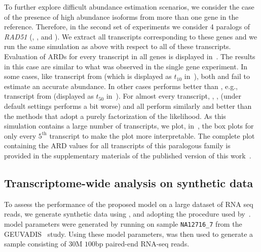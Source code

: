 To further explore difficult abundance estimation scenarios, we consider the
case of the presence of high abundance isoforms from more than one gene in the
reference. Therefore, in the second set of experiments we consider 4 paralogs of
\textit{RAD51} (, ,  and ).
We extract all transcripts corresponding to these genes and we run the same
simulation as above with respect to all of these transcripts. Evaluation of ARDs
for every transcript in all genes is displayed in~. The
results in this case are similar to what was observed in the single gene
experiment. In some cases, like transcript  from
 (which is displayed as $t_{10}$ in~), both
\salu and \salmon fail to estimate an accurate abundance. In other cases \salmon
performs better than \salmonu, e.g., transcript  from
 (displayed as $t_{50}$ in~). For almost every
transcript, \salmonrf, \salmonfm, \expressEM (\express under default settings
performs a bit worse) and \rsem all perform similarly and better than the
methods that adopt a purely \cb factorization of the likelihood. As this
simulation contains a large number of transcripts, we plot,
in~, the box plots for only every $5^\text{th}$ transcript
to make the plot more interpretable. The complete plot containing the ARD values
for all transcripts of this paralogous family is provided
in the supplementary materials of the published version of this work~\citep{ddfact}. 

\subsection{Transcriptome-wide analysis on synthetic data}
\label{res:largescale}
To assess the performance of the proposed model on a large dataset of RNA seq
reads, we generate synthetic data using \rsemsim, and adopting the procedure
used by~\citet{Bray2016Kallisto}. \rsem model parameters were generated by
running \rsem on sample \texttt{NA12716\_7} from the
GEUVADIS~\citep{Lappalainen2013Transcriptome} study. Using these model
parameters, \rsemsim was then used to generate a sample consisting of $30$M
$100$bp paired-end RNA-seq reads.

